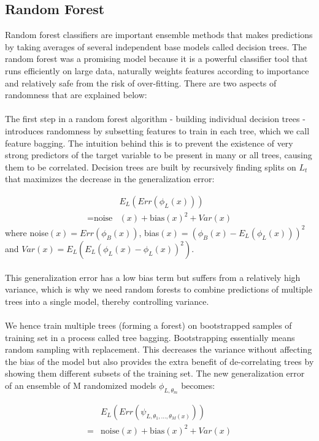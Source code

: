 \documentclass[letterpaper]{article}
\begin{document}
\subsection{Random Forest}
Random forest classifiers are important ensemble methods that makes predictions by taking averages of several independent base models called decision trees. The random forest was a promising model because it is a powerful classifier tool that runs efficiently on large data, naturally weights features according to importance and relatively safe from the risk of over-fitting. There are two aspects of randomness that are explained below:\\
\\
The first step in a random forest algorithm - building individual decision trees - introduces randomness by subsetting features to train in each tree, which we call feature bagging. The intuition behind this is to prevent the existence of very strong predictors of the target variable to be present in many or all trees, causing them to be correlated. Decision trees are built by recursively finding splits on $L_t$ that maximizes the decrease in the generalization error:

\begin{equation}
\begin{split}
&E_L(Err(\phi_L(x))) \\
= \text{noise}&(x) + \text{bias}(x)^2 + Var(x)
\end{split}
\end{equation}
where noise$(x) = Err(\phi_B(x))$, bias$(x) = (\phi_B(x) - E_L(\phi_L(x)))^2$ and $Var(x) = E_L(E_L(\phi_L(x) - \phi_L(x))^2)$.\\
\\
This generalization error has a low bias term but suffers from a relatively high variance, which is why we need random forests to combine predictions of multiple trees into a single model, thereby controlling variance.\\
\\
We hence train multiple trees (forming a forest) on bootstrapped samples of training set in a process called tree bagging. Bootstrapping essentially means random sampling with replacement. This decreases the variance without affecting the bias of the model but also provides the extra benefit of de-correlating trees by showing them different subsets of the training set. The new generalization error of an ensemble of M randomized models $\phi_{L,\theta_m}$ becomes:

\begin{equation}
\begin{split}
&E_L(Err(\psi_{L,\theta_1,...,\theta_M(x)})) \\
= &\text{noise}(x) + \text{bias}(x)^2 + Var(x)
\end{split}
\end{equation}
\end{document}
